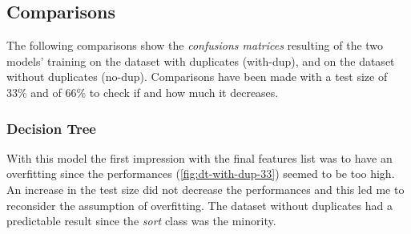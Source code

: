\documentclass[11pt]{article}
\begin{document}
	\subsection{Comparisons}
	The following comparisons show the \textit{confusions matrices} resulting
	of the two models' training on the dataset with duplicates (with-dup), and
	on the dataset without duplicates (no-dup).
	Comparisons have been made with a test size of 33\% and of 66\% to check if
	and how much it decreases.
	
	\subsubsection{Decision Tree}
	With this model the first impression with the final features list
	was to have an overfitting since the performances (\autoref{fig:dt-with-dup-33})
	seemed to be too high.
	An increase in the test size did not decrease the performances and this led me
	to reconsider the assumption of overfitting.
	The dataset without duplicates had a predictable result since the \textit{sort}
	class was the minority. 
\end{document}
